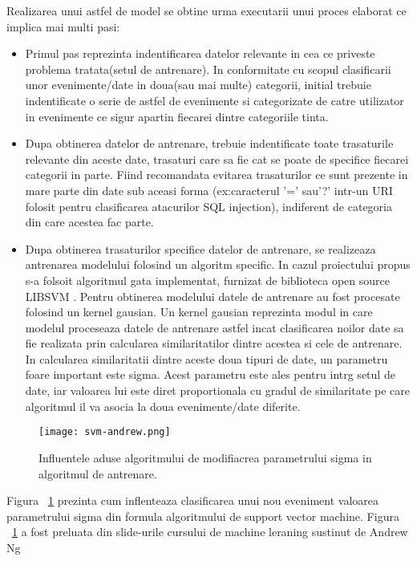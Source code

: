 Realizarea unui astfel de model se obtine urma executarii unui proces elaborat ce implica mai multi pasi:
\begin{itemize}
	\item  Primul pas reprezinta indentificarea datelor relevante in cea ce priveste problema tratata(setul de antrenare). In conformitate cu scopul clasificarii unor evenimente/date in doua(sau mai multe) categorii, initial trebuie indentificate o serie de astfel de evenimente si categorizate de catre utilizator in evenimente ce sigur apartin fiecarei dintre categoriile tinta.
	\item Dupa  obtinerea datelor de antrenare, trebuie indentificate toate trasaturile relevante din aceste date, trasaturi care sa fie cat se poate de specifice fiecarei categorii in parte. Fiind recomandata evitarea trasaturilor ce sunt prezente in mare parte din date sub aceasi forma (ex:caracterul '=' sau'?' intr-un URI folosit pentru clasificarea atacurilor SQL injection), indiferent de categoria din care acestea fac parte.
	\item Dupa obtinerea trasaturilor specifice datelor de antrenare, se realizeaza antrenarea modelului folosind un algoritm specific. In cazul proiectului propus s-a folsoit algoritmul gata implementat, furnizat de biblioteca open source LIBSVM \cite{libsvm}. Pentru obtinerea modelului datele de antrenare au fost procesate folosind un kernel gausian. Un kernel gausian reprezinta modul in care modelul proceseaza datele de antrenare astfel incat clasificarea noilor date sa fie realizata prin calcularea similaritatilor dintre acestea si cele de antrenare. In calcularea similaritatii dintre aceste doua tipuri de date, un parametru foare important este sigma. Acest parametru este ales pentru intrg setul de date, iar valoarea lui este diret proportionala cu gradul de similaritate pe care algoritmul il va asocia la doua evenimente/date diferite.
\end{itemize}



\begin{figure}[h]
	\centering
	\texttt{[image: svm-andrew.png]}
	\caption{Influentele aduse algoritmului de modifiacrea parametrului sigma in algoritmul de antrenare.}
	\label{fig:rev-proxy}
\end{figure}

Figura ~\ref{fig:rev-proxy} prezinta cum inflenteaza clasificarea unui nou eveniment valoarea parametrului sigma din formula algoritmului de support vector machine. Figura ~\ref{fig:rev-proxy} a fost preluata din slide-urile cursului de machine leraning sustinut de Andrew Ng \cite{andrew_ng} \\


